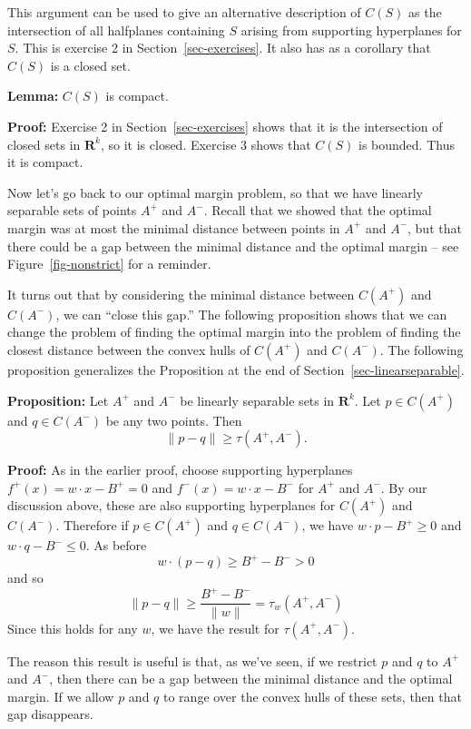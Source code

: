 \documentclass[
  11pt,
  letterpaper,
]{scrbook}
\theoremstyle{plain}
\theoremstyle{remark}
\begin{document}
This argument can be used to give an alternative description of \(C(S)\)
as the intersection of all halfplanes containing \(S\) arising from
supporting hyperplanes for \(S\). This is exercise 2 in
Section~\ref{sec-exercises}. It also has as a corollary that \(C(S)\) is
a closed set.

\textbf{Lemma:} \(C(S)\) is compact.

\textbf{Proof:} Exercise 2 in Section~\ref{sec-exercises} shows that it
is the intersection of closed sets in \(\mathbf{R}^{k}\), so it is
closed. Exercise 3 shows that \(C(S)\) is bounded. Thus it is compact.

Now let's go back to our optimal margin problem, so that we have
linearly separable sets of points \(A^{+}\) and \(A^{-}\). Recall that
we showed that the optimal margin was at most the minimal distance
between points in \(A^{+}\) and \(A^{-}\), but that there could be a gap
between the minimal distance and the optimal margin -- see
Figure~\ref{fig-nonstrict} for a reminder.

It turns out that by considering the minimal distance between
\(C(A^{+})\) and \(C(A^{-})\), we can ``close this gap.'' The following
proposition shows that we can change the problem of finding the optimal
margin into the problem of finding the closest distance between the
convex hulls of \(C(A^{+})\) and \(C(A^{-})\). The following proposition
generalizes the Proposition at the end of
Section~\ref{sec-linearseparable}.

\textbf{Proposition:} Let \(A^{+}\) and \(A^{-}\) be linearly separable
sets in \(\mathbf{R}^{k}\). Let \(p\in C(A^{+})\) and \(q\in C(A^{-})\)
be any two points. Then \[
\|p-q\|\ge \tau(A^{+},A^{-}).
\]

\textbf{Proof:} As in the earlier proof, choose supporting hyperplanes
\(f^{+}(x)=w\cdot x-B^{+}=0\) and \(f^{-}(x)=w\cdot x-B^{-}\) for
\(A^{+}\) and \(A^{-}\). By our discussion above, these are also
supporting hyperplanes for \(C(A^{+})\) and \(C(A^{-})\). Therefore if
\(p\in C(A^{+})\) and \(q\in C(A^{-})\), we have \(w\cdot p-B^{+}\ge 0\)
and \(w\cdot q-B^{-}\le 0\). As before \[
w\cdot(p-q)\ge B^{+}-B^{-}>0
\] and so \[
\|p-q\|\ge\frac{B^{+}-B^{-}}{\|w\|}=\tau_{w}(A^{+},A^{-})
\] Since this holds for any \(w\), we have the result for
\(\tau(A^{+},A^{-})\).

The reason this result is useful is that, as we've seen, if we restrict
\(p\) and \(q\) to \(A^{+}\) and \(A^{-}\), then there can be a gap
between the minimal distance and the optimal margin. If we allow \(p\)
and \(q\) to range over the convex hulls of these sets, then that gap
disappears.
\end{document}
